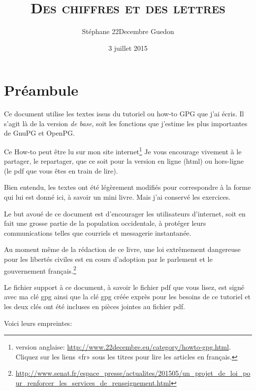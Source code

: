 \documentclass[10pt,a4paper,openany]{book}
\title{\scshape Des chiffres et des lettres}
\author{Stéphane 22Decembre Guedon}
\date{3 juillet 2015}
\begin{document}
	\maketitle

	\chapter{Préambule}
	
	Ce document utilise les textes issus du tutoriel ou how-to GPG que j'ai écris. Il s'agit là de la version \textit{de base}, soit les fonctions que j'estime les plus importantes de GnuPG et OpenPG.
	
	Ce How-to peut être lu sur mon site internet\footnote{version anglaise: \url{http://www.22decembre.eu/category/howto-gpg.html}. Cliquez sur les liens «fr» sous les titres pour lire les articles en français.} Je vous encourage vivement à le partager, le repartager, que ce soit pour la version en ligne (html) ou hors-ligne (le pdf que vous êtes en train de lire).
	
	Bien entendu, les textes ont été légèrement modifiés pour correspondre à la forme qui lui est donné ici, à savoir un mini livre. Mais j'ai conservé les exercices.
	
	Le but avoué de ce document est d'encourager les utilisateurs d'internet, soit en fait une grosse partie de la population occidentale, à protéger leurs communications telles que courriels et messagerie instantanée.
	
	Au moment même de la rédaction de ce livre, une loi extrêmement dangereuse pour les libertés 
	civiles est en cours d'adoption par le parlement et le gouvernement français.\footnote{\url{http://www.senat.fr/espace_presse/actualites/201505/un_projet_de_loi_pour_renforcer_les_services_de_renseignement.html}}
	
	Le fichier support à ce document, à savoir le fichier pdf que vous lisez, est signé avec ma clé gpg ainsi que la clé gpg créée exprès pour les besoins de ce tutoriel et les deux clés ont été incluses en pièces jointes au fichier pdf.
	
	Voici leurs empreintes:
	
	\begin{center}
	\end{center}
	\begin{center}
	\end{center}
	
\end{document}
